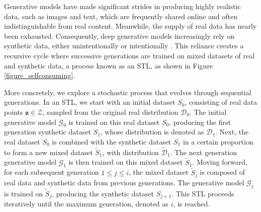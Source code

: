 Generative models have made significant strides in producing highly realistic data, such as images and text, which are frequently shared online and often indistinguishable from real content. Meanwhile, the supply of real data has nearly been exhausted. Consequently, deep generative models increasingly rely on synthetic data, either unintentionally \citep{schuhmann2022laion} or intentionally \citep{huang2022large}. This reliance creates a recursive cycle where successive generations are trained on mixed datasets of real and synthetic data, a process known as an STL, as shown in Figure \ref{figure_selfconsuming}.

More concretely, we explore a stochastic process that evolves through sequential generations. In an STL, we start with an initial dataset $S_0$, consisting of real data points $\boldsymbol{z} \in \mathcal{Z}$, sampled from the original real distribution $\mathcal{D}_0$. The initial generative model $\mathcal{G}_0$ is trained on this real dataset $S_0$, producing the first generation synthetic dataset $S_1$, whose distribution is denoted as $\mathcal{D}_1$. Next, the real dataset $S_0$ is combined with the synthetic dataset $S_1$ in a certain proportion to form a new mixed dataset $\widetilde{S}_1$, with distribution $\widetilde{\mathcal{D}}_1$. The next generation generative model $\mathcal{G}_1$ is then trained on this mixed dataset $\widetilde{S}_1$. Moving forward, for each subsequent generation $1\leq j \leq i$, the mixed dataset $\widetilde{S}_j$ is composed of real data and synthetic data from previous generations. The generative model $\mathcal{G}_j$ is trained on $\widetilde{S}_j$, producing the synthetic dataset $S_{j+1}$. This STL proceeds iteratively until the maximum generation, denoted as $i$, is reached.

